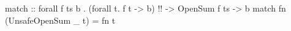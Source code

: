 \begin{code}
match
    :: forall f ts b
     . (forall t. f t -> b)  !!
    -> OpenSum f ts
    -> b
match fn (UnsafeOpenSum _ t) = fn t
\end{code}
